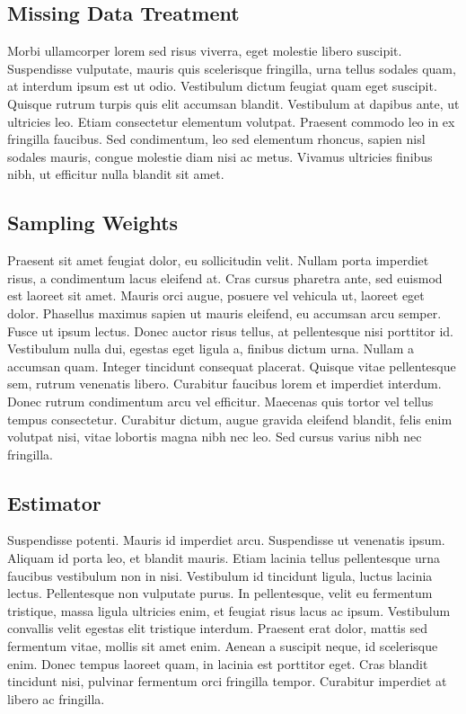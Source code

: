 \subsection{Missing Data Treatment}

Morbi ullamcorper lorem sed risus viverra, eget molestie libero suscipit. Suspendisse vulputate, mauris quis scelerisque fringilla, urna tellus sodales quam, at interdum ipsum est ut odio. Vestibulum dictum feugiat quam eget suscipit. Quisque rutrum turpis quis elit accumsan blandit. Vestibulum at dapibus ante, ut ultricies leo. Etiam consectetur elementum volutpat. Praesent commodo leo in ex fringilla faucibus. Sed condimentum, leo sed elementum rhoncus, sapien nisl sodales mauris, congue molestie diam nisi ac metus. Vivamus ultricies finibus nibh, ut efficitur nulla blandit sit amet.

\subsection{Sampling Weights}

Praesent sit amet feugiat dolor, eu sollicitudin velit. Nullam porta imperdiet risus, a condimentum lacus eleifend at. Cras cursus pharetra ante, sed euismod est laoreet sit amet. Mauris orci augue, posuere vel vehicula ut, laoreet eget dolor. Phasellus maximus sapien ut mauris eleifend, eu accumsan arcu semper. Fusce ut ipsum lectus. Donec auctor risus tellus, at pellentesque nisi porttitor id. Vestibulum nulla dui, egestas eget ligula a, finibus dictum urna. Nullam a accumsan quam. Integer tincidunt consequat placerat. Quisque vitae pellentesque sem, rutrum venenatis libero. Curabitur faucibus lorem et imperdiet interdum. Donec rutrum condimentum arcu vel efficitur. Maecenas quis tortor vel tellus tempus consectetur. Curabitur dictum, augue gravida eleifend blandit, felis enim volutpat nisi, vitae lobortis magna nibh nec leo. Sed cursus varius nibh nec fringilla.

\subsection{Estimator}

Suspendisse potenti. Mauris id imperdiet arcu. Suspendisse ut venenatis ipsum. Aliquam id porta leo, et blandit mauris. Etiam lacinia tellus pellentesque urna faucibus vestibulum non in nisi. Vestibulum id tincidunt ligula, luctus lacinia lectus. Pellentesque non vulputate purus. In pellentesque, velit eu fermentum tristique, massa ligula ultricies enim, et feugiat risus lacus ac ipsum. Vestibulum convallis velit egestas elit tristique interdum. Praesent erat dolor, mattis sed fermentum vitae, mollis sit amet enim. Aenean a suscipit neque, id scelerisque enim. Donec tempus laoreet quam, in lacinia est porttitor eget. Cras blandit tincidunt nisi, pulvinar fermentum orci fringilla tempor. Curabitur imperdiet at libero ac fringilla.

